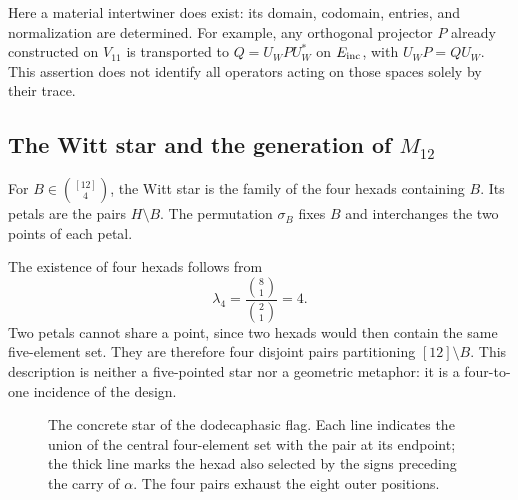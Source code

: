 Here a material intertwiner does exist: its domain, codomain,
entries, and normalization are determined. For example, any
orthogonal projector $P$ already constructed on $V_{11}$ is transported to
$Q=U_WPU_W^*$ on $E_{\rm inc}$, with
$U_WP=QU_W$. This assertion does not identify all
operators acting on those spaces solely by their trace.

\subsection{The Witt star and the generation of \texorpdfstring{$M_{12}$}{M12}}
\label{exc:estrella}

\begin{definition}
\label{exc:def-estrella}
For $B\in\binom{[12]}4$, the Witt star is the family of the
four hexads containing $B$. Its petals are the pairs $H\setminus B$.
The permutation $\sigma_B$ fixes $B$ and interchanges the two points of each
petal.
\end{definition}

The existence of four hexads follows from
\[
 \lambda_4=\frac{\binom81}{\binom21}=4.
\]
Two petals cannot share a point, since two hexads would then
contain the same five-element set. They are therefore four disjoint pairs
partitioning $[12]\setminus B$. This description is neither a five-pointed
star nor a geometric metaphor: it is a four-to-one
incidence of the design.

\begin{figure}[htbp]
\centering
{}
\caption{The concrete star of the dodecaphasic flag. Each line
indicates the union of the central four-element set with the pair at its endpoint; the
thick line marks the hexad also selected by the signs
preceding the carry of $\alpha$. The four pairs exhaust the eight
outer positions.}
\label{exc:fig-estrella}
\end{figure}

